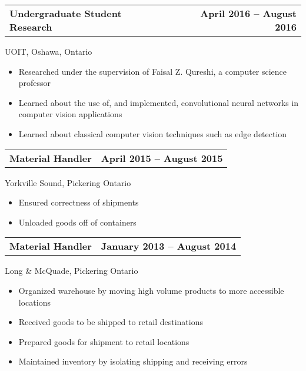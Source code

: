 \documentclass[]{article}
\begin{document}
%
\begin{tabu} to 
  \textbf{Undergraduate Student Research} &
  \textbf{April 2016 -- August 2016}
\end{tabu}
%
UOIT, Oshawa, Ontario
%
\begin{itemize}
\item
  Researched under the supervision of Faisal Z. Qureshi, a computer
  science professor
\item
  Learned about the use of, and implemented, convolutional neural networks in computer
  vision applications
\item
  Learned about classical computer vision techniques such as edge detection
\end{itemize}
\pagebreak %
\begin{tabu} to 
  \textbf{Material Handler} &
  \textbf{April 2015 -- August 2015}\\
\end{tabu}
%
Yorkville Sound, Pickering Ontario
%
\begin{itemize}
\item
  Ensured correctness of shipments
\item
  Unloaded goods off of containers
\end{itemize}
\begin{tabu} to 
  \textbf{Material Handler} & \textbf{January 2013 -- August 2014} \\
\end{tabu}
%
Long \& McQuade, Pickering Ontario
%
\begin{itemize}
\item
  Organized warehouse by moving high volume products to more
  accessible locations
\item
  Received goods to be shipped to retail destinations
\item
  Prepared goods for shipment to retail locations
\item
  Maintained inventory by isolating shipping and receiving errors
\end{itemize}
\end{document}
